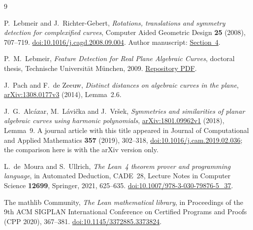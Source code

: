 \documentclass[11pt,a4paper]{article}
\theoremstyle{definition}
\begin{document}
\begin{thebibliography}{9}
\raggedright %
P.~Lebmeir and J.~Richter-Gebert,
\emph{Rotations, translations and symmetry detection for complexified curves},
Computer Aided Geometric Design \textbf{25} (2008), 707--719.
\href{https://doi.org/10.1016/j.cagd.2008.09.004}{doi:10.1016/j.cagd.2008.09.004}.
Author manuscript:
\href{https://science-to-touch.com/Articles/jrg/53_VorauPaper.pdf}{Section~4}.

P.~M.~Lebmeir,
\emph{Feature Detection for Real Plane Algebraic Curves},
doctoral thesis, Technische Universit\"at M\"unchen, 2009.
\href{https://mediatum.ub.tum.de/doc/681056/512338.pdf}{Repository PDF}.

J.~Pach and F.~de Zeeuw,
\emph{Distinct distances on algebraic curves in the plane},
\href{https://arxiv.org/abs/1308.0177v3}{arXiv:1308.0177v3} (2014),
Lemma~2.6.

J.~G.~Alc\'azar, M.~L\'avi\v cka and J.~Vr\v sek,
\emph{Symmetries and similarities of planar algebraic curves using
harmonic polynomials},
\href{https://arxiv.org/abs/1801.09962v1}{arXiv:1801.09962v1} (2018),
Lemma~9. A journal article with this title appeared in
Journal of Computational and Applied Mathematics \textbf{357} (2019),
302--318, \href{https://doi.org/10.1016/j.cam.2019.02.036}{doi:10.1016/j.cam.2019.02.036};
the comparison here is with the arXiv version only.

L.~de~Moura and S.~Ullrich,
\emph{The Lean~4 theorem prover and programming language},
in Automated Deduction, CADE~28, Lecture Notes in Computer Science
\textbf{12699}, Springer, 2021, 625--635.
\href{https://doi.org/10.1007/978-3-030-79876-5_37}{doi:10.1007/978-3-030-79876-5\_37}.

The mathlib Community,
\emph{The Lean mathematical library},
in Proceedings of the 9th ACM SIGPLAN International Conference on Certified
Programs and Proofs (CPP 2020), 367--381.
\href{https://doi.org/10.1145/3372885.3373824}{doi:10.1145/3372885.3373824}.
\end{thebibliography}
\end{document}
